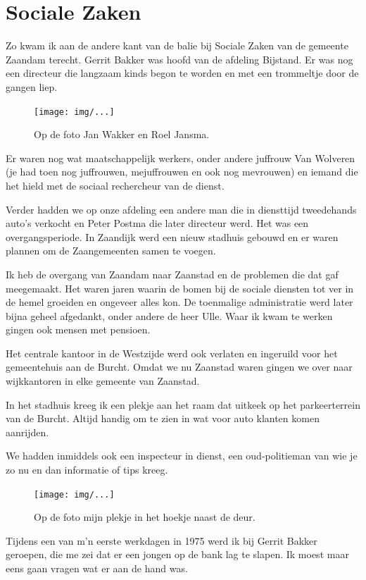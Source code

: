 \documentclass[12pt,twoside, openright]{memoir}
\begin{document}
\chapter{Sociale Zaken} %
\label{cha:socialezaken}

Zo kwam ik aan de andere kant van de balie bij Sociale Zaken van de gemeente Zaandam terecht. Gerrit Bakker was hoofd van de afdeling Bijstand. Er was nog een directeur die langzaam kinds begon te worden en met een trommeltje door de gangen liep. 

\begin{figure}[t]
\texttt{[image: img/...]}
\caption{Op de foto Jan Wakker en Roel Jansma.}
\end{figure}

Er waren nog wat maatschappelijk werkers, onder andere juffrouw Van Wolveren (je had toen nog juffrouwen, mejuffrouwen en ook nog mevrouwen) en iemand die het hield met de sociaal rechercheur van de dienst. 

Verder hadden we op onze afdeling een andere man die in diensttijd tweedehands auto’s verkocht en Peter Postma die later directeur werd. Het was een overgangsperiode. In Zaandijk werd een nieuw stadhuis gebouwd en er waren plannen om de Zaangemeenten samen te voegen.

Ik heb de overgang van Zaandam naar Zaanstad en de problemen die dat gaf meegemaakt. Het waren jaren waarin de bomen bij de sociale diensten tot ver in de hemel groeiden en ongeveer alles kon. De toenmalige administratie werd later bijna geheel afgedankt, onder andere de heer Ulle. Waar ik kwam te werken gingen ook mensen met pensioen.

Het centrale kantoor in de Westzijde werd ook verlaten en ingeruild voor het gemeentehuis aan de Burcht. Omdat we nu Zaanstad waren gingen we over naar wijkkantoren in elke gemeente van Zaanstad. 

In het stadhuis kreeg ik een plekje aan het raam dat uitkeek op het parkeerterrein van de Burcht. Altijd handig om te zien in wat voor auto klanten komen aanrijden. 

We hadden inmiddels ook een inspecteur in dienst, een oud-politieman van wie je zo nu en dan informatie of tips kreeg. 

\begin{figure}[t]
\texttt{[image: img/...]}
\caption{Op de foto mijn plekje in het hoekje naast de deur.}
\end{figure}

Tijdens een van m’n eerste werkdagen in 1975 werd ik bij Gerrit Bakker geroepen, die me zei dat er een jongen op de bank lag te slapen. Ik moest maar eens gaan vragen wat er aan de hand was. 
\end{document}

